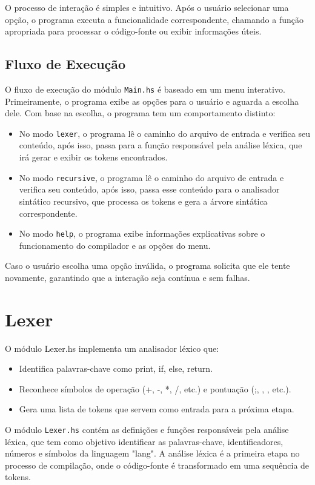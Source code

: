 \documentclass{article}
\begin{document}
O processo de interação é simples e intuitivo. Após o usuário selecionar uma opção, o programa executa a funcionalidade correspondente, chamando a função apropriada para processar o código-fonte ou exibir informações úteis.

\subsection{Fluxo de Execução}

O fluxo de execução do módulo \texttt{Main.hs} é baseado em um menu interativo. Primeiramente, o programa exibe as opções para o usuário e aguarda a escolha dele. Com base na escolha, o programa tem um comportamento distinto:

\begin{itemize}
    \item No modo \texttt{lexer}, o programa lê o caminho do arquivo de entrada e verifica seu conteúdo, após isso, passa para a função responsável pela análise léxica, que irá gerar e exibir os tokens encontrados.
    \item No modo \texttt{recursive}, o programa lê o caminho do arquivo de entrada e verifica seu conteúdo, após isso, passa esse conteúdo para o analisador sintático recursivo, que processa os tokens e gera a árvore sintática correspondente.
    \item No modo \texttt{help}, o programa exibe informações explicativas sobre o funcionamento do compilador e as opções do menu.
\end{itemize}

Caso o usuário escolha uma opção inválida, o programa solicita que ele tente novamente, garantindo que a interação seja contínua e sem falhas.

\section{Lexer}
O módulo Lexer.hs implementa um analisador léxico que:
\begin{itemize}
    \item Identifica palavras-chave como print, if, else, return. 
    \item Reconhece símbolos de operação (+, -, *, /, etc.) e pontuação (;, {, }, etc.). 
    \item Gera uma lista de tokens que servem como entrada para a próxima etapa. 
\end{itemize}

O módulo \texttt{Lexer.hs} contém as definições e funções responsáveis pela análise léxica, que tem como objetivo identificar as palavras-chave, identificadores, números e símbolos da linguagem "lang". A análise léxica é a primeira etapa no processo de compilação, onde o código-fonte é transformado em uma sequência de tokens.
\end{document}
